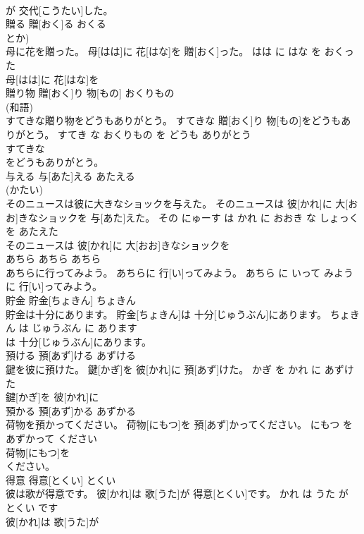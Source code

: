 \documentclass[8pt]{extreport}
\begin{document}
\begin{CJK}{UTF8}{min}
\\	が 交代[こうたい]した。		
\\	贈る	贈[おく]る	おくる	
\\	とか)		
\\	母に花を贈った。	母[はは]に 花[はな]を 贈[おく]った。	はは に はな を おくった	
\\	母[はは]に 花[はな]を
\\	贈り物	贈[おく]り 物[もの]	おくりもの	
\\	(和語)		
\\	すてきな贈り物をどうもありがとう。	すてきな 贈[おく]り 物[もの]をどうもありがとう。	すてき な おくりもの を どうも ありがとう	
\\	すてきな
\\	をどうもありがとう。		
\\	与える	与[あた]える	あたえる	
\\	(かたい)		
\\	そのニュースは彼に大きなショックを与えた。	そのニュースは 彼[かれ]に 大[おお]きなショックを 与[あた]えた。	その にゅーす は かれ に おおき な しょっく を あたえた	
\\	そのニュースは 彼[かれ]に 大[おお]きなショックを
\\	あちら	あちら	あちら	
\\	あちらに行ってみよう。	あちらに 行[い]ってみよう。	あちら に いって みよう	
\\	に 行[い]ってみよう。		
\\	貯金	貯金[ちょきん]	ちょきん	
\\	貯金は十分にあります。	貯金[ちょきん]は 十分[じゅうぶん]にあります。	ちょきん は じゅうぶん に あります	
\\	は 十分[じゅうぶん]にあります。		
\\	預ける	預[あず]ける	あずける	
\\	鍵を彼に預けた。	鍵[かぎ]を 彼[かれ]に 預[あず]けた。	かぎ を かれ に あずけた	
\\	鍵[かぎ]を 彼[かれ]に
\\	預かる	預[あず]かる	あずかる	
\\	荷物を預かってください。	荷物[にもつ]を 預[あず]かってください。	にもつ を あずかって ください	
\\	荷物[にもつ]を
\\	ください。		
\\	得意	得意[とくい]	とくい	
\\	彼は歌が得意です。	彼[かれ]は 歌[うた]が 得意[とくい]です。	かれ は うた が とくい です	
\\	彼[かれ]は 歌[うた]が

\end{CJK}
\end{document}
